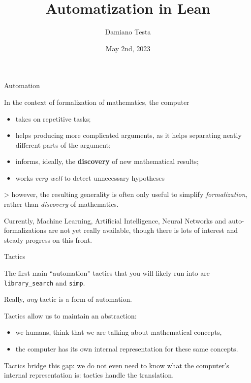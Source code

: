 \documentclass{beamer}
\title{Automatization in Lean}
\author{Damiano Testa}
\institute{University of Warwick}
\date{May 2nd, 2023}
\begin{document}
\frame{\titlepage}

\begin{frame}[fragile]
{Automation}

In the context of formalization of mathematics, the computer

\begin{itemize}
\item
  takes on repetitive tasks;
\item
  helps producing more complicated arguments, as it helps separating neatly different parts of the argument;
\item
  informs, ideally, the {\textbf{discovery}} of new mathematical results;
\item
  works {\emph{very well}} to detect unnecessary hypotheses
\end{itemize}

  > however, the resulting generality is often only useful to simplify {\emph{formalization}}, rather than {\emph{discovery}} of mathematics.


Currently, Machine Learning, Artificial Intelligence, Neural Networks and auto-formalizations are not yet really available, though there is lots of interest and steady progress on this front.
\end{frame}

\begin{frame}[fragile]{Tactics}

The first main ``automation'' tactics that you will likely run into are {\verb`library_search`} and {\verb`simp`}.

Really, {\emph{any}} tactic is a form of automation.

Tactics allow us to maintain an abstraction:

\begin{itemize}
\item
  we humans, think that we are talking about mathematical concepts,
\item
  the computer has its own internal representation for these same concepts.
\end{itemize}

Tactics bridge this gap: we do not even need to know what the computer's internal representation is: tactics handle the translation.
\end{frame}
\end{document}
